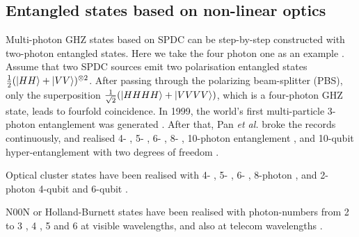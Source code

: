 %
%

\subsection{Entangled states based on non-linear optics} 

Multi-photon GHZ states based on SPDC \cite{bib:PhysRevLett.75.4337} can be step-by-step constructed with two-photon entangled states. Here we take the four photon one as an example \cite{bib:pan2012multiphoton}. Assume that two SPDC sources emit two polarisation entangled states \mbox{$\frac{1}{2}(|HH\rangle + |VV\rangle)^{\otimes 2}$}. After passing through the polarizing beam-splitter (PBS), only the superposition \mbox{$\frac{1}{\sqrt{2}}(|HHHH\rangle + |VVVV\rangle)$}, which is a four-photon GHZ state, leads to fourfold coincidence. In 1999, the world's first multi-particle 3-photon entanglement was generated \cite{bib:bouwmeester1999observation, bib:pan2000experimental}. After that, Pan \textit{et al.} broke the records continuously, and realised 4- \cite{bib:zhao2003experimental}, 5- \cite{bib:zhao2004experimental}, 6- \cite{bib:lu2007experimental}, 8- \cite{bib:yao2012observation}, 10-photon entanglement \cite{bib:tenPhotEnt}, and 10-qubit hyper-entanglement with two degrees of freedom \cite{bib:gao2010experimental}.

Optical cluster states have been realised with 4- \cite{bib:walther2005experimental}, 5- \cite{bib:lu2008experimental}, 6- \cite{bib:lu2007experimental}, 8-photon \cite{bib:yao2012experimental}, and 2-photon 4-qubit \cite{bib:chen2007experimental} and 6-qubit \cite{bib:ceccarelli2009experimental}.

N00N or Holland-Burnett states have been realised with photon-numbers from 2 \cite{bib:edamatsu2002measurement} to 3 \cite{bib:mitchell2004super}, 4 \cite{bib:walther2004broglie, bib:nagata2007beating, bib:matthews2011heralding}, 5 \cite{bib:afek2010high} and 6 \cite{bib:xiang2012optimal} at visible wavelengths, and also at telecom wavelengths \cite{bib:yabuno2012four, bib:bisht2015spectral, bib:jin2016detection}.

